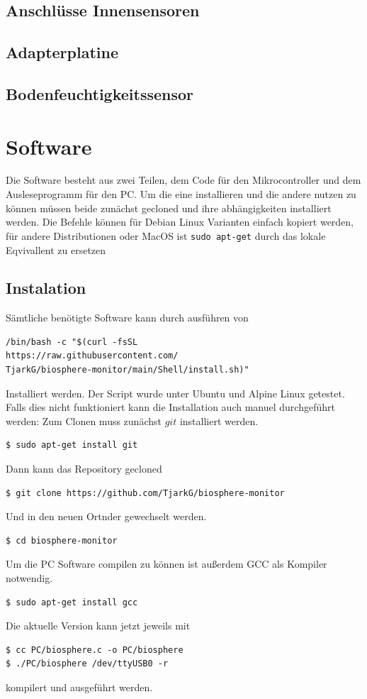 \documentclass[12pt, a4paper, oneside]{report}
\begin{document}
\section{Anschlüsse Innensensoren}
\label{sec:Innensensoren}

\section{Adapterplatine}
\label{sec:Adapterplatine}

\section{Bodenfeuchtigkeitssensor}
\label{sec:Bodenfeuchtigkeitssensor}

\chapter{Software}
Die Software besteht aus zwei Teilen, dem Code für den Mikrocontroller und dem Ausleseprogramm für den PC. Um die eine installieren und die andere nutzen zu können müssen beide zunächst gecloned und ihre abhängigkeiten installiert werden. Die Befehle können für Debian Linux Varianten einfach kopiert werden, für andere Distributionen oder MacOS ist \lstinline|sudo apt-get| durch das lokale Eqvivallent zu ersetzen
\section{Instalation}
\label{sec:Instalation}
Sämtliche benötigte Software kann durch ausführen von
\begin{lstlisting}
/bin/bash -c "$(curl -fsSL 
https://raw.githubusercontent.com/
TjarkG/biosphere-monitor/main/Shell/install.sh)"
\end{lstlisting}
Installiert werden. Der Script wurde unter Ubuntu und Alpine Linux getestet. Falls dies nicht funktioniert kann die Installation auch manuel durchgeführt werden:
Zum Clonen muss zunächst $git$ installiert werden.
\begin{lstlisting}
$ sudo apt-get install git
\end{lstlisting}
Dann kann das Repository gecloned
\begin{lstlisting}
$ git clone https://github.com/TjarkG/biosphere-monitor
\end{lstlisting}
Und in den neuen Ortnder gewechselt werden.
\begin{lstlisting}
$ cd biosphere-monitor
\end{lstlisting}
Um die PC Software compilen zu können ist außerdem GCC als Kompiler notwendig.
\begin{lstlisting}
$ sudo apt-get install gcc
\end{lstlisting}
Die aktuelle Version kann jetzt jeweils mit
\begin{lstlisting}
$ cc PC/biosphere.c -o PC/biosphere
$ ./PC/biosphere /dev/ttyUSB0 -r
\end{lstlisting}
kompilert und ausgeführt werden. 
\pagebreak
\end{document}

